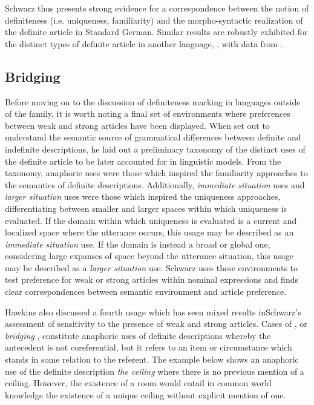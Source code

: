 \documentclass[output=paper,modfonts,nonflat]{langsci/langscibook}
\begin{document}
Schwarz thus presents strong evidence for a correspondence between the notion of definiteness (i.e. uniqueness, familiarity) and the morpho-syntactic realization of the definite article in Standard German.  Similar results are robustly exhibited for the distinct types of definite article in another  language, , with data from \citet{Ebert1971}.

\subsection{Bridging} \label{sec:cisneros:2.3}

Before moving on to the discussion of definiteness marking in languages outside of the  family, it is worth noting a final set of  environments where preferences between weak and strong articles have been displayed.  When \citet{Hawkins1978} set out to understand the semantic source of grammatical differences between definite and indefinite descriptions, he laid out a preliminary taxonomy of the distinct uses of the definite article to be later accounted for in linguistic models.  From the taxonomy, anaphoric uses were those which inspired the familiarity approaches to the semantics of definite descriptions. Additionally, \textit{immediate situation} uses and \textit{larger situation} uses were those which inspired the uniqueness approaches, differentiating between smaller and larger spaces within which uniqueness is evaluated.  If the domain within which uniqueness is evaluated is a current and localized space where the utterance occurs, this usage may be described as an \textit{immediate situation} use.  If the domain is instead a broad or global one, considering large expanses of space beyond the utterance situation, this usage may be described as a \textit{larger situation} use.  Schwarz uses these  environments to test preference for weak or strong articles within nominal expressions and finds clear correspondences between semantic environment and article preference.

Hawkins also discussed a fourth usage which has seen mixed results in\linebreak Schwarz's assessment of sensitivity to the presence of weak and strong articles.  Cases of , or \textit{bridging} \citep{Clark1975}, constitute anaphoric uses of definite descriptions whereby the antecedent is not coreferential, but it refers to an item or circumstance which stands in some relation to the referent.  The example below shows an anaphoric use of the definite description \textit{the ceiling} where there is no previous mention of a ceiling.  However, the existence of a room would entail in common world knowledge the existence of a unique ceiling without explicit mention of one.
\end{document}
